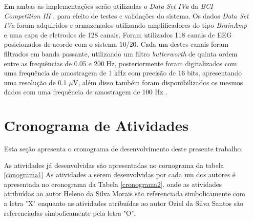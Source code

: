 Em ambas as implementações serão utilizadas o \textit{Data Set IVa} da \textit{BCI Competition III} \cite{BCICompetition}, para efeito de testes e validações do sistema.
Os dados \textit{Data Set IVa} foram adquiridos e armazenados utilizando amplificadores do tipo \textit{BrainAmp} e uma capa de eletrodos de 128 canais. Foram utilizados 118 canais de EEG posicionados de acordo com o sistema 10/20. Cada um destes canais foram filtrados em banda passante, utilizando um filtro \textit{butterworth} de quinta ordem entre as frequências de 0.05 e 200 Hz, posteriormente foram digitalizados com uma frequência de amostragem de 1 kHz com precisão de 16 bits, apresentando uma resolução de 0.1 $\mu$V, além disso também foram disponibilizados os mesmos dados com uma frequência de amostragem de 100 Hz \cite{siteBCI}.


\section{Cronograma de Atividades}
Esta seção apresenta o cronograma de desenvolvimento deste presente trabalho.

As atividades já desenvolvidas são apresentadas no cornograma da tabela \ref{conograma1}
As atividades a serem desenvolvidas por cada um dos autores é apresentada no cronograma da Tabela \ref{cronograma2}, onde as atividades atribuídas ao autor Heleno da Silva Morais são referenciada simbolicamente com a letra "X" enquanto as atividades atribuídas ao autor Oziel da Silva Santos são referenciadas simbolicamente pela letra "O".

